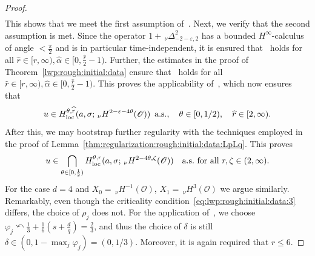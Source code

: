 \documentclass[reqno]{amsart}
\newcommand{\sO}{\mathscr{O}}
\newcommand{\1}{\mathbf{1}}
\newcommand{\loc}{\textup{loc}}
\newcommand{\nH}{\ensuremath{\,_\nu H}}
\newcommand{\bpsn}[1]{\ensuremath{\nH^{#1}(\sO)}}
\begin{document}
\begin{proof}
$$\begin{aligned}
        \end{aligned}$$
        This shows that we meet the first assumption of~\cite[Corollary 6.5]{agrestiNonlinearParabolicStochastic2022a}. 
        Next, we verify that the second assumption is met. Since the  operator $1+\,_\nu\Delta^2_{-2-\varepsilon,2}$ has a bounded $H^\infty$-calculus of angle $<\frac{\pi}{2}$ and is in particular  time-independent, it is ensured that~\cite[Assumption 4.5]{agrestiNonlinearParabolicStochastic2022a} holds for all $\widehat{r}\in [r,\infty), \widehat{\alpha}\in [0,\frac{\widehat{r}}{2}-1)$. Further, the estimates in the proof of Theorem~\ref{lwp:rough:initial:data} ensure that~\cite[Assumption 4.7]{agrestiNonlinearParabolicStochastic2022a} holds for all $\widehat{r}\in [r,\infty), \widehat{\alpha}\in [0,\frac{\widehat{r}}{2}-1)$.
        This proves the applicability of~\cite[Corollary 6.5]{agrestiNonlinearParabolicStochastic2022a}, which now ensures that
		\begin{equation}
			u\in H_{\loc}^{\theta,\widehat r}(a,\sigma; \bpsn{2-\varepsilon-4\theta})\,\text{ a.s.},\quad \theta\in [0,1/2), \quad \widehat{r}\in [2,\infty). 
		\end{equation}
		After this, we may bootstrap further regularity with the techniques employed in the proof of Lemma~\ref{thm:regularization:rough:initial:data:LpLq}. This proves 
		\begin{equation}
			u\in \bigcap_{\theta\in [0,\frac{1}{2})} H_{\loc}^{\theta,r}(a,\sigma; \bpsn{2-4\theta,\zeta}) \quad \text{a.s.\ for all } r,\zeta\in (2,\infty). 
		\end{equation}
        For the case $d=4$ and $X_0=\bpsn{-1}$, $X_1=\bpsn{3}$ we argue similarly.
        Remarkably, even though the criticality condition~\eqref{eq:lwp:rough:initial:data:3} differs, the choice of $\rho_j$ does not. 
        For the application of~\cite[Theorem 6.8]{agrestiNonlinearParabolicStochastic2022a}, we choose $\varphi_j\curvearrowleft \frac{1}{3}+\frac{1}{6}(s+\frac{d}{q})=\frac{2}{3}$, and thus the choice of $\delta$ is still $\delta\in (0,1-\max_j \varphi_j)=(0,1/3)$. Moreover, it is again required that $r\le 6$. 
	\end{proof}
    
\end{document}
